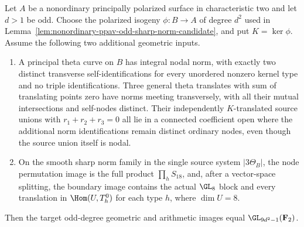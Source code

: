 \begin{theorem}
\label{thm:three-theta-conditional-full-image-candidate}
Let $A$ be a nonordinary principally polarized surface in
characteristic two and let $d>1$ be odd. Choose the polarized
isogeny $\phi:B\to A$ of degree $d^2$ used in
Lemma~\ref{lem:nonordinary-ppav-odd-sharp-norm-candidate}, and put
$K=\ker\phi$. Assume the following two additional geometric inputs.
\begin{enumerate}
\item A principal theta curve on $B$ has integral nodal norm, with
exactly two distinct transverse self-identifications for every
unordered nonzero kernel type and no triple identifications.
Three general theta translates with sum of translating points zero
have norms meeting transversely, with all their mutual intersections
and self-nodes distinct. Their independently $K$-translated source
unions with $r_1+r_2+r_3=0$ all lie in a connected coefficient open
where the additional norm identifications remain distinct ordinary
nodes, even though the source union itself is nodal.
\item On the smooth sharp norm family in the single source system
$|3\Theta_B|$, the node permutation image is the full product
$\prod_hS_{18}$, and, after a vector-space splitting, the boundary
image contains the actual $\GL_8$ block and every translation in
$\Hom(U,T_h^0)$ for each type $h$, where $\dim U=8$.
\end{enumerate}
Then the target odd-degree geometric and arithmetic images equal
$\GL_{9d^2-1}(\mathbf F_2)$.
\end{theorem}

